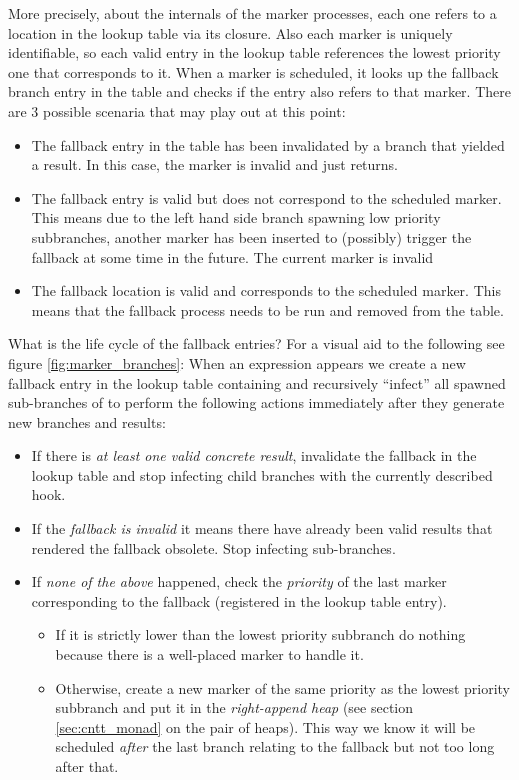 More precisely, about the internals of the marker processes, each one
refers to a location in the lookup table via its closure. Also each
marker is uniquely identifiable, so each valid entry in the lookup
table references the lowest priority one that corresponds
to it. When a marker is scheduled, it looks up the fallback branch
entry in the table and checks if the entry also refers to that
marker. There are 3 possible scenaria that may play out at this point:

\begin{itemize}
\item The fallback entry in the table has been invalidated by a branch
  that yielded a result. In this case, the marker is invalid and just
  returns.
\item The fallback entry is valid but does not correspond to the
  scheduled marker. This means due to the left hand side branch
  spawning low priority subbranches, another marker has been inserted
  to (possibly) trigger the fallback at some time in the future. The
  current marker is invalid
\item The fallback location is valid and corresponds to the scheduled
  marker. This means that the fallback process needs to be run
  and removed from the table.
\end{itemize}

What is the life cycle of the fallback entries? For a visual aid to the
following see figure \ref{fig:marker_branches}: When an expression
 appears we create a new fallback entry in the lookup
table containing  and recursively ``infect'' all spawned
sub-branches of  to perform the following actions immediately
after they generate new branches and results:

\begin{itemize}
\item If there is \emph{at least one valid concrete result}, invalidate the
  fallback in the lookup table and stop infecting child branches with
  the currently described hook.
\item If the \emph{fallback is invalid} it means there have already been
  valid results that rendered the fallback obsolete. Stop infecting
  sub-branches.
\item If \emph{none of the above} happened, check the \emph{priority} of the
  last marker corresponding to the fallback (registered in the lookup
  table entry).

  \begin{itemize}
  \item If it is strictly lower than the lowest priority
    subbranch do nothing because there is a well-placed marker to handle
    it.
  \item Otherwise, create a new marker of the same priority as the
    lowest priority subbranch and put it in the \emph{right-append
    heap} (see section \ref{sec:cntt_monad} on the pair of
    heaps). This way we know it will be scheduled \emph{after} the
    last branch relating to the fallback but not too long after that.
  \end{itemize}


\end{itemize}

